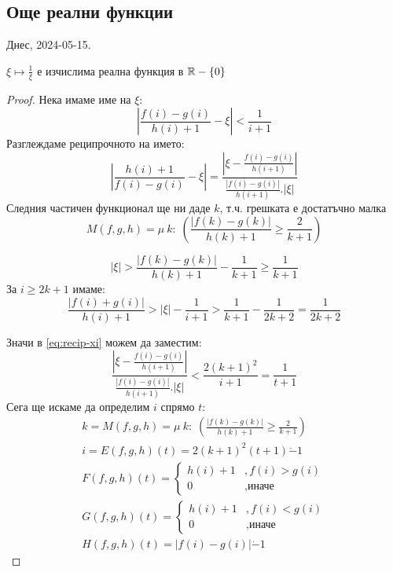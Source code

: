\subsection{Още реални функции}
Днес, 2024-05-15.

\begin{theorem}[Реципрочно]
    $\xi \mapsto \frac{1}{\xi}$ е изчислима реална функция в ${\mathbb{R}} - \{0\}$
\end{theorem}
\begin{proof}
    Нека имаме име на $\xi$:
    \begin{equation}
        \left|\frac{f(i) - g(i)}{h(i) + 1} - \xi \right| < \frac{1}{i+1}
    \end{equation}
    Разглеждаме реципрочното на името:
    \begin{equation}\label{eq:recip-xi}
        \left|\frac{h(i) + 1}{f(i) - g(i)} - \xi \right| = \frac{\left|\xi - \frac{f(i) - g(i)}{h(i+1)}\right|}{\frac{\left|f(i) - g(i)\right|}{h(i+1)}. |\xi|}
    \end{equation}
    Следния частичен функционал ще ни даде $k$, т.ч. грешката е достатъчно малка
    \begin{equation}
        M(f,g,h) = \mu\ k:\; \left(\frac{\left|f(k) - g(k)\right|}{h(k) + 1} \geq \frac{2}{k+1}\right)
    \end{equation}

    \begin{equation}\tag{$k = M(f,g,h)$}
        |\xi| > \frac{|f(k) - g(k)|}{h(k) + 1} - \frac{1}{k+1} \geq \frac{1}{k+1}
    \end{equation}
    За $i \geq 2k+1$ имаме:
    \begin{equation}
        \frac{|f(i) + g(i)|}{h(i) + 1} > |\xi| - \frac{1}{i+1} > \frac{1}{k+1} - \frac{1}{2k+2} = \frac{1}{2k+2}
    \end{equation}

    Значи в \eqref{eq:recip-xi} можем да заместим:
    \begin{equation}
        \frac{\left|\xi - \frac{f(i) - g(i)}{h(i+1)}\right|}{\frac{\left|f(i) - g(i)\right|}{h(i+1)}. |\xi|} < \frac{2(k+1)^2}{i+1} = \frac{1}{t+1}
    \end{equation}
    Сега ще искаме да определим $i$ спрямо $t$:
    \begin{eqnarray}
        k = M(f, g, h) = \mu\ k:\; \left(\frac{\left|f(k) - g(k)\right|}{h(k) + 1} \geq \frac{2}{k+1}\right)\\
        i = E(f, g, h)(t) = 2(k+1)^2(t+1) \dot{-} 1 \\
        F(f, g, h)(t) = \begin{cases}
            h(i) + 1 & , f(i) > g(i)  \\
            0        & , \text{иначе}
        \end{cases} \\
        G(f, g, h)(t) = \begin{cases}
            h(i) + 1 & , f(i) < g(i)  \\
            0        & , \text{иначе}
        \end{cases} \\
        H(f, g, h)(t) = |f(i) - g(i)| \dot - 1
    \end{eqnarray}
\end{proof}
